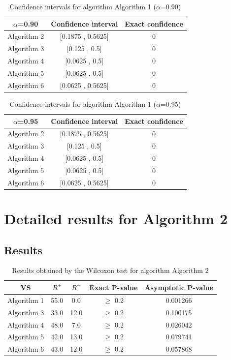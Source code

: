 \documentclass[a4paper,10pt]{article}
\begin{document}
\begin{table}[!htp]
\centering\small
\begin{tabular}{
|c|c|c|}
\hline
 $\alpha$=0.90 & Confidence interval & Exact confidence \\ \hline 
Algorithm 2 & [0.1875 , 0.5625] & 0\\ \hline 
Algorithm 3 & [0.125 , 0.5] & 0\\ \hline 
Algorithm 4 & [0.0625 , 0.5] & 0\\ \hline 
Algorithm 5 & [0.0625 , 0.5] & 0\\ \hline 
Algorithm 6 & [0.0625 , 0.5625] & 0\\ \hline 

\end{tabular}
\caption{Confidence intervals for algorithm Algorithm 1 ($\alpha$=0.90)}
\end{table}
\begin{table}[!htp]
\centering\small
\begin{tabular}{
|c|c|c|}
\hline
 $\alpha$=0.95 & Confidence interval & Exact confidence \\ \hline 
Algorithm 2 & [0.1875 , 0.5625] & 0\\ \hline 
Algorithm 3 & [0.125 , 0.5] & 0\\ \hline 
Algorithm 4 & [0.0625 , 0.5] & 0\\ \hline 
Algorithm 5 & [0.0625 , 0.5] & 0\\ \hline 
Algorithm 6 & [0.0625 , 0.5625] & 0\\ \hline 

\end{tabular}
\caption{Confidence intervals for algorithm Algorithm 1 ($\alpha$=0.95)}
\end{table}

 \clearpage 


\section{Detailed results for Algorithm 2}


\subsection{Results}

\begin{table}[!htp]
\centering\small
\begin{tabular}{
|c|c|c|c|c|}
\hline
 VS & $R^{+}$ & $R^{-}$ & Exact P-value & Asymptotic P-value \\ \hline 
Algorithm 1 & 55.0 & 0.0 & $\geq$ 0.2 & 0.001266\\ \hline 
Algorithm 3 & 33.0 & 12.0 & $\geq$ 0.2 & 0.100175\\ \hline 
Algorithm 4 & 48.0 & 7.0 & $\geq$ 0.2 & 0.026042\\ \hline 
Algorithm 5 & 42.0 & 13.0 & $\geq$ 0.2 & 0.079741\\ \hline 
Algorithm 6 & 43.0 & 12.0 & $\geq$ 0.2 & 0.057868\\ \hline 

\end{tabular}
\caption{Results obtained by the Wilcoxon test for algorithm Algorithm 2}
\end{table}
\end{document}
